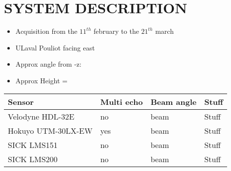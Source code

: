 \section{SYSTEM DESCRIPTION}

\begin{itemize}
    \item Acquisition from the $11^{th}$ february to the $21^{th}$ march
    \item ULaval Pouliot facing east
    \item Approx angle from -z:
    \item Approx Height =
\end{itemize}

\begin{table}[htbp]
    \centering
    \begin{tabularx}{\linewidth}{|X||X|X|X|}\hline
        Sensor              & Multi echo & Beam angle & Stuff \\ \hline%
        Velodyne HDL-32E    & no         & beam       & Stuff \\ \hline
        Hokuyo UTM-30LX-EW  & yes        & beam       & Stuff \\ \hline
        SICK LMS151         & no         & beam       & Stuff \\ \hline
        SICK LMS200         & no         & beam       & Stuff \\ \hline
    \end{tabularx}
\end{table}
